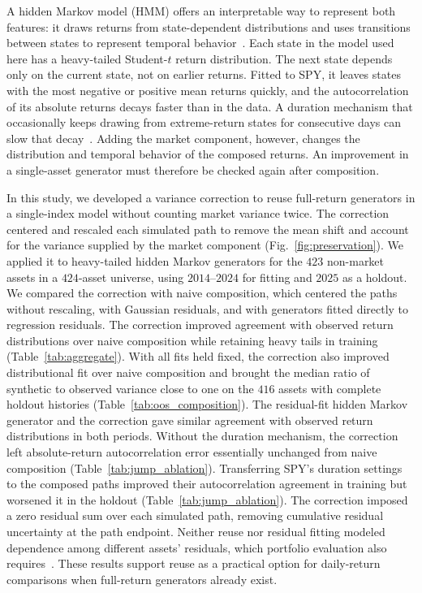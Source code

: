 A hidden Markov model (HMM) offers an interpretable way to represent
both features: it draws returns from state-dependent distributions
and uses transitions between states to represent temporal
behavior~\cite{rabinerJuang1986, rydenTerasvirtaAsbrink1998}. Each state in the
model used here has a heavy-tailed Student-$t$ return distribution. The next state depends only on the current state, not
on earlier returns. Fitted to SPY, it
leaves states with the most negative or positive mean returns quickly,
and the autocorrelation of
its absolute returns decays faster than in the data. A duration
mechanism that occasionally keeps drawing from extreme-return states
for consecutive days can slow that decay~\cite{bullaBulla2006}.
Adding the market component, however, changes the distribution and
temporal behavior of the composed returns. An improvement in a
single-asset generator must therefore be checked again after
composition.


In this study, we developed a variance correction to reuse full-return
generators in a single-index model without counting market variance
twice. The correction centered and rescaled each simulated path to
remove the mean shift and account for the variance supplied by the
market component
(Fig.~\ref{fig:preservation}). We applied it to heavy-tailed hidden
Markov generators for the $423$ non-market assets in a $424$-asset
universe, using $2014$--$2024$ for fitting and $2025$ as a holdout.
We compared the correction with naive composition, which centered the
paths without rescaling, with Gaussian residuals, and with generators
fitted directly to regression residuals. The correction improved
agreement with observed return distributions over naive composition
while retaining heavy tails in training (Table~\ref{tab:aggregate}).
With all fits held fixed, the correction also improved distributional
fit over naive composition and
brought the median ratio of synthetic to observed variance close to
one on the $416$ assets with complete holdout histories
(Table~\ref{tab:oos_composition}). The residual-fit hidden Markov
generator and the correction gave similar agreement with observed
return distributions in both periods. Without the duration mechanism, the correction left absolute-return
autocorrelation error essentially unchanged from naive composition (Table~\ref{tab:jump_ablation}).
Transferring SPY's duration settings to the composed paths improved
their autocorrelation agreement in training but worsened it in the
holdout (Table~\ref{tab:jump_ablation}).
The correction imposed a zero residual sum over each simulated path,
removing cumulative residual uncertainty at the path endpoint. Neither reuse nor residual
fitting modeled dependence among different assets' residuals, which
portfolio evaluation also requires~\cite{embrechtsMcNeilStraumann2002,
boucheyNemtchinovWong2015}. These results support reuse as a practical
option for daily-return comparisons when full-return generators
already exist.
